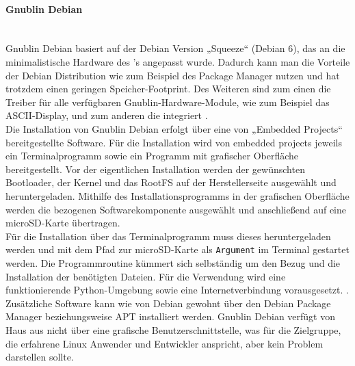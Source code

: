 \documentclass[../Bachelorarbeit.tex]{subfiles}
\begin{document}
\paragraph{Gnublin Debian}\mbox{}\\
\label{para:gnublin_debian} 
Gnublin Debian basiert auf der Debian Version „Squeeze“ (Debian 6), das an die 
minimalistische Hardware des 's angepasst wurde. Dadurch kann man die Vorteile 
der Debian Distribution wie zum Beispiel des Package Manager nutzen und hat trotzdem 
einen geringen Speicher-Footprint. Des Weiteren sind zum einen die Treiber für alle 
verfügbaren Gnublin-Hardware-Module, wie zum Beispiel das \acs{ASCII}-Display, und zum anderen die 
 integriert
\parencite[vgl.][]{gnublin_debian}. \\
Die Installation von Gnublin Debian erfolgt über eine von „Embedded Projects“ 
bereitgestellte Software. Für die Installation wird von embedded projects jeweils ein 
Terminalprogramm sowie ein Programm mit grafischer Oberfläche bereitgestellt. Vor der 
eigentlichen Installation werden der gewünschten Bootloader, der Kernel und das \ac{RootFS}
auf der Herstellerseite ausgewählt und heruntergeladen. Mithilfe des 
Installationsprogramms in der grafischen Oberfläche werden die bezogenen 
Softwarekomponente ausgewählt und anschließend auf eine microSD-Karte übertragen.\\
Für die Installation über das Terminalprogramm muss dieses heruntergeladen werden und 
mit dem Pfad zur microSD-Karte als \texttt{Argument} im Terminal gestartet werden. Die 
Programmroutine kümmert sich selbständig um den Bezug und die Installation der 
benötigten Dateien. Für die Verwendung wird eine funktionierende Python-Umgebung 
sowie eine Internetverbindung vorausgesetzt.
\parencite[vgl.][]{gnublin_debian_installer}. \\
Zusätzliche Software kann wie von Debian gewohnt über den Debian Package Manager 
beziehungsweise \ac{APT} installiert werden. 
Gnublin Debian verfügt von Haus aus nicht über eine grafische Benutzerschnittstelle, was 
für die Zielgruppe, die erfahrene Linux Anwender und Entwickler anspricht, aber kein Problem
darstellen sollte.
\end{document}
